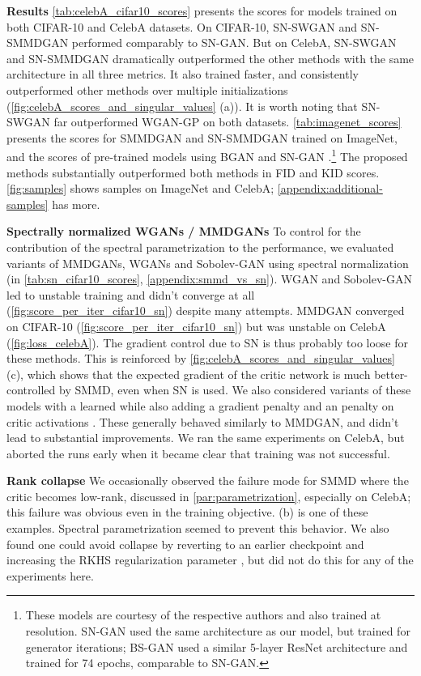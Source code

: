 \documentclass{article}
\let\citep\parencite
\begin{document}
\textbf{Results}
\cref{tab:celebA_cifar10_scores} presents the scores for models trained on both CIFAR-10 and CelebA datasets. On CIFAR-10,  SN-SWGAN and  SN-SMMDGAN performed comparably to SN-GAN. But on CelebA,
SN-SWGAN and SN-SMMDGAN dramatically outperformed the other methods with the same architecture in all three metrics. It also trained faster, and consistently outperformed other methods over multiple initializations (\cref{fig:celebA_scores_and_singular_values} (a)).
It is worth noting that SN-SWGAN far outperformed WGAN-GP on both datasets.
\cref{tab:imagenet_scores} presents the scores for SMMDGAN and SN-SMMDGAN trained on ImageNet,
and the scores of pre-trained models using BGAN \citep{began} and SN-GAN \citep{Miyato:2018}.\footnote{These models are courtesy of the respective authors and also trained at  resolution. SN-GAN used the same architecture as our model, but trained for  generator iterations; BS-GAN used a similar 5-layer ResNet architecture and trained for 74 epochs, comparable to SN-GAN.}
The proposed methods substantially outperformed both methods in FID and KID scores.
\cref{fig:samples} shows samples on ImageNet and CelebA;
\cref{appendix:additional-samples} has more.

\textbf{Spectrally normalized WGANs / MMDGANs}
To control for the contribution of the spectral parametrization to the performance,
we evaluated variants of MMDGANs, WGANs and Sobolev-GAN using spectral normalization
(in \cref{tab:sn_cifar10_scores}, \cref{appendix:smmd_vs_sn}).
WGAN and Sobolev-GAN led to unstable training and didn't converge at all (\cref{fig:score_per_iter_cifar10_sn}) despite many attempts.
MMDGAN converged on CIFAR-10 (\cref{fig:score_per_iter_cifar10_sn})  but was unstable on CelebA (\cref{fig:loss_celebA}).
The gradient control due to SN is thus probably too loose for these methods.
This is reinforced by \cref{fig:celebA_scores_and_singular_values} (c),
which shows that the expected gradient of the critic network
is much better-controlled by SMMD, even when SN is used.
We also considered variants of these models with a learned 
while also adding a gradient penalty and an  penalty on critic activations \citep[footnote 19]{Binkowski:2018}.
These generally behaved similarly to MMDGAN, and didn't lead to substantial improvements.
We ran the same experiments on CelebA,
but aborted the runs early when it became clear that training was not successful.


\textbf{Rank collapse}
We occasionally observed the failure mode for SMMD where the critic becomes low-rank,
discussed in \cref{par:parametrization},
especially on CelebA;
this failure was obvious even in the training objective.
 (b) is one of these examples.
Spectral parametrization seemed to prevent this behavior.
We also found one could avoid collapse by reverting to an earlier checkpoint
and increasing the RKHS regularization parameter ,
but did not do this for any of the experiments here.
\end{document}
